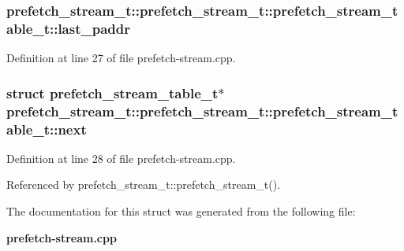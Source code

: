 \subsubsection[{last\_\-paddr}]{ prefetch\_\-stream\_\-t::prefetch\_\-stream\_\-t::prefetch\_\-stream\_\-table\_\-t::last\_\-paddr}\label{structprefetch__stream__t_1_1prefetch__stream__table__t_cd660fe596c539873ae4e3995fec8789}




Definition at line 27 of file prefetch-stream.cpp.
\subsubsection[{next}]{\setlength{\rightskip}{0pt plus 5cm}struct {\bf prefetch\_\-stream\_\-table\_\-t}$\ast$ prefetch\_\-stream\_\-t::prefetch\_\-stream\_\-t::prefetch\_\-stream\_\-table\_\-t::next\hspace{0.3cm}{\tt  [read]}}\label{structprefetch__stream__t_1_1prefetch__stream__table__t_0693f8f1cbcd79d7554f35b6457010b3}




Definition at line 28 of file prefetch-stream.cpp.

Referenced by prefetch\_\-stream\_\-t::prefetch\_\-stream\_\-t().

The documentation for this struct was generated from the following file:\begin{CompactItemize}
\item 
{\bf prefetch-stream.cpp}\end{CompactItemize}
